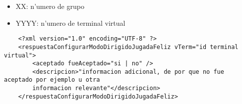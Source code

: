  
\begin{itemize}
    \item{XX: n'umero de grupo}
    \item{YYYY: n'umero de terminal virtual}
\end{itemize}

\begin{verbatim}
    <?xml version="1.0" encoding="UTF-8" ?>
    <respuestaConfigurarModoDirigidoJugadaFeliz vTerm="id terminal virtual">
        <aceptado fueAceptado="si | no" />
        <descripcion>"informacion adicional, de por que no fue aceptado por ejemplo u otra
        informacion relevante"</descripcion>
    </respuestaConfigurarModoDirigidoJugadaFeliz>
\end{verbatim}
